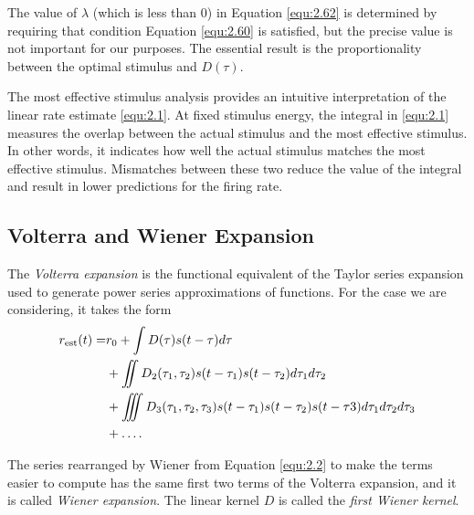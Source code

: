 \begin{rem}
  The value of $\lambda$ (which is less than $0$) in Equation \ref{equ:2.62} is determined by requiring that condition Equation \ref{equ:2.60} is satisfied, but the precise value is not important for our purposes. The essential result is the proportionality between the optimal stimulus and $D(\tau)$.
\end{rem}

\begin{rem}
  The most effective stimulus analysis provides an intuitive interpretation of the linear rate estimate \ref{equ:2.1}. At fixed stimulus energy, the integral in \ref{equ:2.1} measures the overlap between the actual stimulus and the most effective stimulus. In other words, it indicates how well the actual stimulus matches the most effective stimulus. Mismatches between these two reduce the value of the integral and result in lower predictions for the firing
rate.
\end{rem}

\subsection{ Volterra and Wiener Expansion}
\begin{defn}
  \label{VolterraExpansion}
  The \emph{Volterra expansion} is the functional equivalent of the Taylor series expansion used to generate power series approximations of functions. For the case we are considering, it takes the form
  \begin{equation}
    \label{equ:2.2}
    \begin{aligned}
      r_{\rm{est}}(t) = &r_0 + \int D(\tau)s(t-\tau)d\tau \\
      &+ \iint D_2(\tau_1,\tau_2)s(t-\tau_1)s(t-\tau_2)d\tau_1d\tau_2 \\
      &+ \iiint D_3(\tau_1,\tau_2,\tau_3)s(t-\tau_1)s(t-\tau_2)s(t-\tau3)d\tau_1d\tau_2d\tau_3 \\
      &+ \dots.
    \end{aligned}
  \end{equation}
\end{defn}

\begin{defn}
  \label{WienerExpansion}
  The series rearranged by Wiener from Equation \ref{equ:2.2} to make the terms easier to compute has the same first two terms of the Volterra expansion, and it is called \emph{Wiener expansion}.
  The linear kernel $D$ is called the \emph{first Wiener kernel}.
\end{defn}

